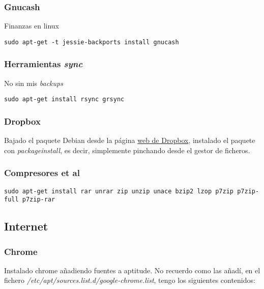 \documentclass[12pt,spanish,]{article}
\begin{document}
\subsubsection{Gnucash}\label{gnucash}

Finanzas en linux

\begin{verbatim}
sudo apt-get -t jessie-backports install gnucash
\end{verbatim}

\subsubsection{\texorpdfstring{Herramientas
\emph{sync}}{Herramientas sync}}\label{herramientas-sync}

No sin mis \emph{backups}

\begin{verbatim}
sudo apt-get install rsync grsync
\end{verbatim}

\subsubsection{Dropbox}\label{dropbox}

Bajado el paquete Debian desde la página
\href{https://www.dropbox.com/install-linux}{web de Dropbox}, instalado
el paquete con \emph{packageinstall}, es decir, simplemente pinchando
desde el gestor de ficheros.

\subsubsection{Compresores et al}\label{compresores-et-al}

\begin{verbatim}
sudo apt-get install rar unrar zip unzip unace bzip2 lzop p7zip p7zip-full p7zip-rar
\end{verbatim}

\subsection{Internet}\label{internet}

\subsubsection{Chrome}\label{chrome}

Instalado chrome añadiendo fuentes a aptitude. No recuerdo como las
añadí, en el fichero \emph{/etc/apt/sources.list.d/google-chrome.list},
tengo los siguientes contenidos:
\end{document}

